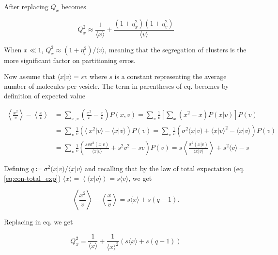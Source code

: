 After replacing $Q_x$ becomes

\begin{equation*}
  \boxed{Q_x^2 \approx \frac{1}{\langle x\rangle} + \frac{(1+\eta_x^2)(1+\eta_v^2)}{\langle v\rangle}}
\end{equation*}

When $x\ll 1$, $Q_x^2\approx(1+\eta_v^2)/\langle v\rangle$, meaning that the segregation of clusters is the more significant factor on partitioning erros.


Now assume that $\langle x|v\rangle = sv$ where $s$ is a constant representing the average number of molecules per vesicle. The term in parentheses of eq. \label{eq:div-clus-Qx2} becomes by definition of expected value

\begin{equation}
  \begin{split}
    \left\langle \frac{x^2}{v}\right\rangle-\left\langle \frac{x}{v}\right\rangle &= \sum_{x,v}\left( \frac{x^2}{v}- \frac{x}{v}\right)P(x,v) = \sum_v\frac{1}{v}\left[\sum_x\left(x^2- x\right)P(x|v)\right]P(v)\\
    &=\sum_v\frac{1}{v}\left(\langle\ x^2|v\rangle - \langle x|v\rangle\right)P(v)=\sum_v\frac{1}{v}\left(\sigma^2(x|v) + \langle x|v\rangle^2-\langle x|v\rangle\right)P(v)\\
    &=\sum_v\frac{1}{v}\left(\frac{sv\sigma^2(x|v)}{\langle x|v\rangle} + s^2v^2-sv\right)P(v) = s\left\langle\frac{\sigma^2(x|v)}{\langle x|v\rangle}\right\rangle + s^2\langle v\rangle - s
  \end{split}
\end{equation}

Defining $q\coloneqq\sigma^2(x|v)/\langle x|v\rangle$ and recalling that by the law of total expectation (eq. \eqref{eq:con-total_exp})  $\langle x\rangle = \left\langle\langle x|v\rangle\right\rangle = s\langle v\rangle$, we get

\begin{equation}
  \left\langle \frac{x^2}{v}\right\rangle-\left\langle \frac{x}{v}\right\rangle = s\langle x\rangle+s(q-1).
\end{equation}

Replacing in eq. \label{eq:div-clus-Qx2} we get

\begin{equation}
  Q_x^2 = \frac{1}{\langle x\rangle} + \frac{1}{\langle x\rangle^2}\left(s\langle x\rangle+s(q-1)\right)
\end{equation}

